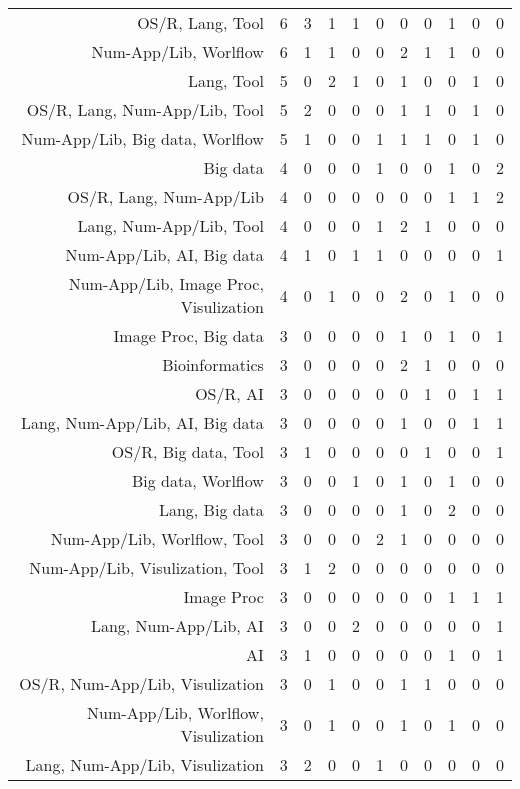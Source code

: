 {\begin{landscape}
\begin{longtable}[htb]{r|c|c|c|c|c|c|c|c|c|c}
{OS/R, Lang, Tool} & 6 & 3 & 1 & 1 & 0 & 0 & 0 & 1 & 0 & 0 \\%
{Num-App/Lib, Worlflow} & 6 & 1 & 1 & 0 & 0 & 2 & 1 & 1 & 0 & 0 \\%
{Lang, Tool} & 5 & 0 & 2 & 1 & 0 & 1 & 0 & 0 & 1 & 0 \\%
{OS/R, Lang, Num-App/Lib, Tool} & 5 & 2 & 0 & 0 & 0 & 1 & 1 & 0 & 1 & 0 \\%
{Num-App/Lib, Big data, Worlflow} & 5 & 1 & 0 & 0 & 1 & 1 & 1 & 0 & 1 & 0 \\%
{Big data} & 4 & 0 & 0 & 0 & 1 & 0 & 0 & 1 & 0 & 2 \\%
{OS/R, Lang, Num-App/Lib} & 4 & 0 & 0 & 0 & 0 & 0 & 0 & 1 & 1 & 2 \\%
{Lang, Num-App/Lib, Tool} & 4 & 0 & 0 & 0 & 1 & 2 & 1 & 0 & 0 & 0 \\%
{Num-App/Lib, AI, Big data} & 4 & 1 & 0 & 1 & 1 & 0 & 0 & 0 & 0 & 1 \\%
{Num-App/Lib, Image Proc, Visulization} & 4 & 0 & 1 & 0 & 0 & 2 & 0 & 1 & 0 & 0 \\%
{Image Proc, Big data} & 3 & 0 & 0 & 0 & 0 & 1 & 0 & 1 & 0 & 1 \\%
{Bioinformatics} & 3 & 0 & 0 & 0 & 0 & 2 & 1 & 0 & 0 & 0 \\%
{OS/R, AI} & 3 & 0 & 0 & 0 & 0 & 0 & 1 & 0 & 1 & 1 \\%
{Lang, Num-App/Lib, AI, Big data} & 3 & 0 & 0 & 0 & 0 & 1 & 0 & 0 & 1 & 1 \\%
{OS/R, Big data, Tool} & 3 & 1 & 0 & 0 & 0 & 0 & 1 & 0 & 0 & 1 \\%
{Big data, Worlflow} & 3 & 0 & 0 & 1 & 0 & 1 & 0 & 1 & 0 & 0 \\%
{Lang, Big data} & 3 & 0 & 0 & 0 & 0 & 1 & 0 & 2 & 0 & 0 \\%
{Num-App/Lib, Worlflow, Tool} & 3 & 0 & 0 & 0 & 2 & 1 & 0 & 0 & 0 & 0 \\%
{Num-App/Lib, Visulization, Tool} & 3 & 1 & 2 & 0 & 0 & 0 & 0 & 0 & 0 & 0 \\%
{Image Proc} & 3 & 0 & 0 & 0 & 0 & 0 & 0 & 1 & 1 & 1 \\%
{Lang, Num-App/Lib, AI} & 3 & 0 & 0 & 2 & 0 & 0 & 0 & 0 & 0 & 1 \\%
{AI} & 3 & 1 & 0 & 0 & 0 & 0 & 0 & 1 & 0 & 1 \\%
{OS/R, Num-App/Lib, Visulization} & 3 & 0 & 1 & 0 & 0 & 1 & 1 & 0 & 0 & 0 \\%
{Num-App/Lib, Worlflow, Visulization} & 3 & 0 & 1 & 0 & 0 & 1 & 0 & 1 & 0 & 0 \\%
{Lang, Num-App/Lib, Visulization} & 3 & 2 & 0 & 0 & 1 & 0 & 0 & 0 & 0 & 0 \\%

\end{longtable}
\end{landscape}}
